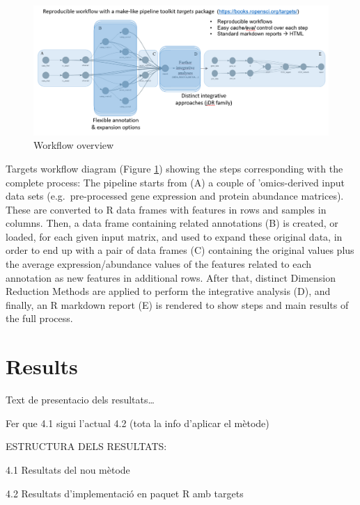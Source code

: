 \documentclass[a4paper, nobind]{templates/ociamthesis}
\renewcommand{\chaptermark}[1]{\markboth{\thechapter. #1}{\thechapter. #1}}
\begin{document}
\begin{figure}

{\centering \includegraphics[width=0.95\linewidth]{figures/chapter3/3-7_workflow_overview} 

}

\caption{Workflow overview}\label{fig:fig3-7}
\end{figure}

Targets workflow diagram (Figure \ref{fig:fig3-7}) showing the steps corresponding with the complete process: The pipeline starts from (A) a couple of 'omics-derived input data sets (e.g.~pre-processed gene expression and protein abundance matrices). These are converted to R data frames with features in rows and samples in columns. Then, a data frame containing related annotations (B) is created, or loaded, for each given input matrix, and used to expand these original data, in order to end up with a pair of data frames (C) containing the original values plus the average expression/abundance values of the features related to each annotation as new features in additional rows. After that, distinct Dimension Reduction Methods are applied to perform the integrative analysis (D), and finally, an R markdown report (E) is rendered to show steps and main results of the full process.

\hypertarget{results}{%
\chapter{Results}\label{results}}

\chaptermark{Results}

\minitoc 

Text de presentacio dels resultats\ldots{}

Fer que 4.1 sigui l'actual 4.2 (tota la info d'aplicar el mètode)

ESTRUCTURA DELS RESULTATS:

4.1 Resultats del nou mètode

4.2 Resultats d'implementació en paquet R amb targets
\end{document}
